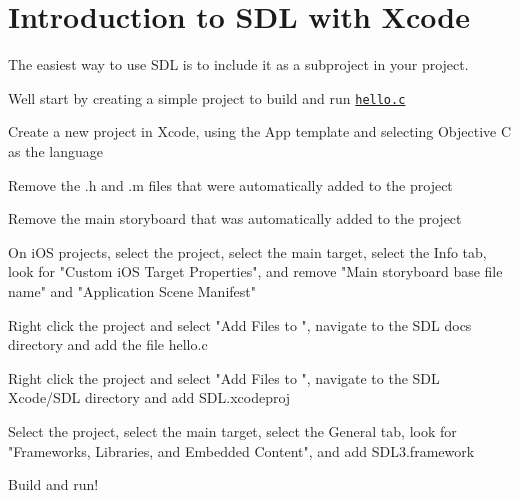 \chapter{Introduction to SDL with Xcode }
\hypertarget{md__mono_runtime_2extern_2sdl_2docs_2_i_n_t_r_o-xcode}{}\label{md__mono_runtime_2extern_2sdl_2docs_2_i_n_t_r_o-xcode}
\label{md__mono_runtime_2extern_2sdl_2docs_2_i_n_t_r_o-xcode_autotoc_md1180}%
%


The easiest way to use SDL is to include it as a subproject in your project.

We\textquotesingle{}ll start by creating a simple project to build and run \href{hello.c}{\texttt{hello.\+c}}


\begin{DoxyItemize}
\item Create a new project in Xcode, using the App template and selecting Objective C as the language
\item Remove the .h and .m files that were automatically added to the project
\item Remove the main storyboard that was automatically added to the project
\item On i\+OS projects, select the project, select the main target, select the Info tab, look for "{}\+Custom i\+OS Target Properties"{}, and remove "{}\+Main storyboard base file name"{} and "{}\+Application Scene Manifest"{}
\item Right click the project and select "{}\+Add Files to \+[project]\+"{}, navigate to the SDL docs directory and add the file hello.\+c
\item Right click the project and select "{}\+Add Files to \+[project]\+"{}, navigate to the SDL Xcode/\+\+SDL directory and add SDL.\+xcodeproj
\item Select the project, select the main target, select the General tab, look for "{}\+Frameworks, Libraries, and Embedded Content"{}, and add SDL3.\+framework
\item Build and run! 
\end{DoxyItemize}
